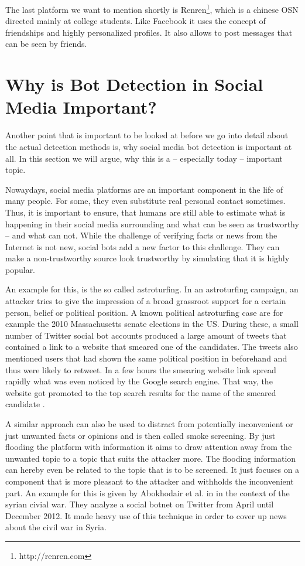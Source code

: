 The last platform we want to mention shortly is Renren\footnote{http://renren.com}, which is a chinese OSN directed mainly at college students. Like Facebook it uses the concept of friendships and highly personalized profiles. It also allows to post messages that can be seen by friends.

\section{Why is Bot Detection in Social Media Important?}
Another point that is important to be looked at before we go into detail about the actual detection methods is, why social media bot detection is important at all. In this section we will argue, why this is a -- especially today -- important topic. 

Nowaydays, social media platforms are an important component in the life of many people. For some, they even substitute real personal contact sometimes. Thus, it is important to ensure, that humans are still able to estimate what is happening in their social media surrounding and what can be seen as trustworthy -- and what can not. While the challenge of verifying facts or news from the Internet is not new, social bots add a new factor to this challenge. They can make a non-trustworthy source look trustworthy by simulating that it is highly popular.

An example for this, is the so called astroturfing. In an astroturfing campaign, an attacker tries to give the impression of a broad grassroot support for a certain person, belief or political position. A known political astroturfing case are for example the 2010 Massachusetts senate elections in the US. During these, a small number of Twitter social bot accounts produced a large amount of tweets that contained a link to a website that smeared one of the candidates. The tweets also mentioned users that had shown the same political position in beforehand and thus were likely to retweet. In a few hours the smearing website link spread rapidly what was even noticed by the Google search engine. That way, the website got promoted to the top search results for the name of the smeared candidate \cite{mustafaraj10}. 

A similar approach can also be used to distract from potentially inconvenient or just unwanted facts or opinions and is then called smoke screening. By just flooding the platform with information it aims to draw attention away from the unwanted topic to a topic that suits the attacker more. The flooding information can hereby even be related to the topic that is to be screened. It just focuses on a component that is more pleasant to the attacker and withholds the inconvenient part. An example for this is given by Abokhodair et al. in \cite{abokhodair} in the context of the syrian civial war. They analyze a social botnet on Twitter from April until December 2012. It made heavy use of this technique in order to cover up news about the civil war in Syria.

